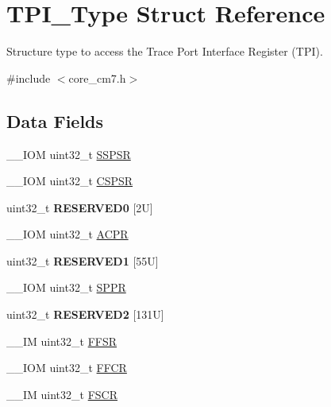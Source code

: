 \hypertarget{structTPI__Type}{}\section{T\+P\+I\+\_\+\+Type Struct Reference}
\label{structTPI__Type}


Structure type to access the Trace Port Interface Register (T\+PI).  




{\ttfamily \#include $<$core\+\_\+cm7.\+h$>$}

\subsection*{Data Fields}
\begin{DoxyCompactItemize}
\item 
\+\_\+\+\_\+\+I\+OM uint32\+\_\+t \mbox{\hyperlink{structTPI__Type_a7b72598e20066133e505bb781690dc22}{S\+S\+P\+SR}}
\item 
\+\_\+\+\_\+\+I\+OM uint32\+\_\+t \mbox{\hyperlink{structTPI__Type_a8826aa84e5806053395a742d38d59d0f}{C\+S\+P\+SR}}
\item 
\mbox{\label{structTPI__Type_a756b2f48761ff7c56b52c1f21bbbf8c2}} 
uint32\+\_\+t {\bfseries R\+E\+S\+E\+R\+V\+E\+D0} \mbox{[}2\+U\mbox{]}
\item 
\+\_\+\+\_\+\+I\+OM uint32\+\_\+t \mbox{\hyperlink{structTPI__Type_a9e5e4421ef9c3d5b7ff8b24abd4e99b3}{A\+C\+PR}}
\item 
\mbox{\label{structTPI__Type_a963e02abdcf2dd9aab284eb91c3db671}} 
uint32\+\_\+t {\bfseries R\+E\+S\+E\+R\+V\+E\+D1} \mbox{[}55\+U\mbox{]}
\item 
\+\_\+\+\_\+\+I\+OM uint32\+\_\+t \mbox{\hyperlink{structTPI__Type_a12f79d4e3ddc69893ba8bff890d04cc5}{S\+P\+PR}}
\item 
\mbox{\label{structTPI__Type_a303a5a79824abcd146935bc0297bc380}} 
uint32\+\_\+t {\bfseries R\+E\+S\+E\+R\+V\+E\+D2} \mbox{[}131\+U\mbox{]}
\item 
\+\_\+\+\_\+\+IM uint32\+\_\+t \mbox{\hyperlink{structTPI__Type_a6c47a0b4c7ffc66093ef993d36bb441c}{F\+F\+SR}}
\item 
\+\_\+\+\_\+\+I\+OM uint32\+\_\+t \mbox{\hyperlink{structTPI__Type_a3f68b6e73561b4849ebf953a894df8d2}{F\+F\+CR}}
\item 
\+\_\+\+\_\+\+IM uint32\+\_\+t \mbox{\hyperlink{structTPI__Type_ad6901bfd8a0089ca7e8a20475cf494a8}{F\+S\+CR}}

\end{DoxyCompactItemize}
